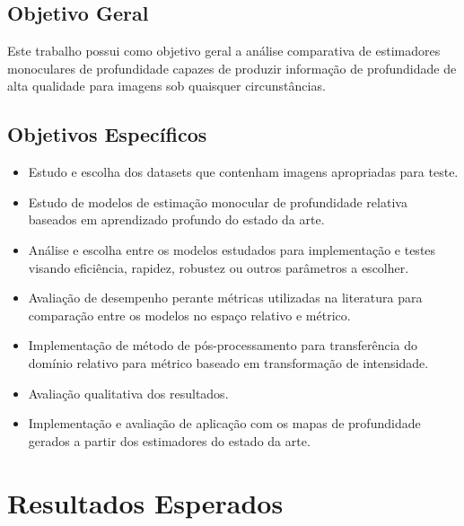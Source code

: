 \subsection{Objetivo Geral}
Este trabalho possui como objetivo geral a análise comparativa de estimadores monoculares de profundidade capazes de produzir informação de profundidade de alta qualidade para imagens sob quaisquer circunstâncias.

\subsection{Objetivos Específicos}

\begin{itemize}
    \item Estudo e escolha dos datasets que contenham imagens apropriadas para teste.
    \item Estudo de modelos de estimação monocular de profundidade relativa baseados em aprendizado profundo do estado da arte.
    \item Análise e escolha entre os modelos estudados para implementação e testes visando eficiência, rapidez, robustez ou outros parâmetros a escolher.
    \item Avaliação de desempenho perante métricas utilizadas na literatura para comparação entre os modelos no espaço relativo e métrico.
    \item Implementação de método de pós-processamento para transferência do domínio relativo para métrico baseado em transformação de intensidade.
    \item Avaliação qualitativa dos resultados.
    \item Implementação e avaliação de aplicação com os mapas de profundidade gerados a partir dos estimadores do estado da arte.
    
\end{itemize}



\section{Resultados Esperados}